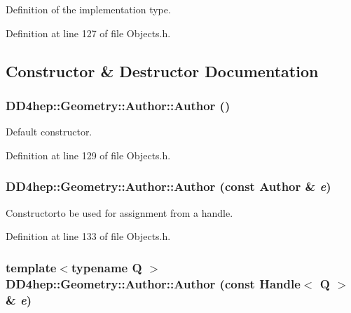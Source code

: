 Definition of the implementation type. 

Definition at line 127 of file Objects.h.

\subsection{Constructor \& Destructor Documentation}
\hypertarget{class_d_d4hep_1_1_geometry_1_1_author_a2803ac1dacb60ce706d59c4e1378f93c}{
\subsubsection[{Author}]{\setlength{\rightskip}{0pt plus 5cm}DD4hep::Geometry::Author::Author ()}}
\label{class_d_d4hep_1_1_geometry_1_1_author_a2803ac1dacb60ce706d59c4e1378f93c}


Default constructor. 

Definition at line 129 of file Objects.h.\hypertarget{class_d_d4hep_1_1_geometry_1_1_author_a9f58da7da25568979eac0c706e6f9d88}{
\subsubsection[{Author}]{\setlength{\rightskip}{0pt plus 5cm}DD4hep::Geometry::Author::Author (const {\bf Author} \& {\em e})}}
\label{class_d_d4hep_1_1_geometry_1_1_author_a9f58da7da25568979eac0c706e6f9d88}


Constructorto be used for assignment from a handle. 

Definition at line 133 of file Objects.h.\hypertarget{class_d_d4hep_1_1_geometry_1_1_author_aab9fc589f8d76f790361021042b9e8c8}{
\subsubsection[{Author}]{\setlength{\rightskip}{0pt plus 5cm}template$<$typename Q $>$ DD4hep::Geometry::Author::Author (const {\bf Handle}$<$ Q $>$ \& {\em e})}}
\label{class_d_d4hep_1_1_geometry_1_1_author_aab9fc589f8d76f790361021042b9e8c8}


